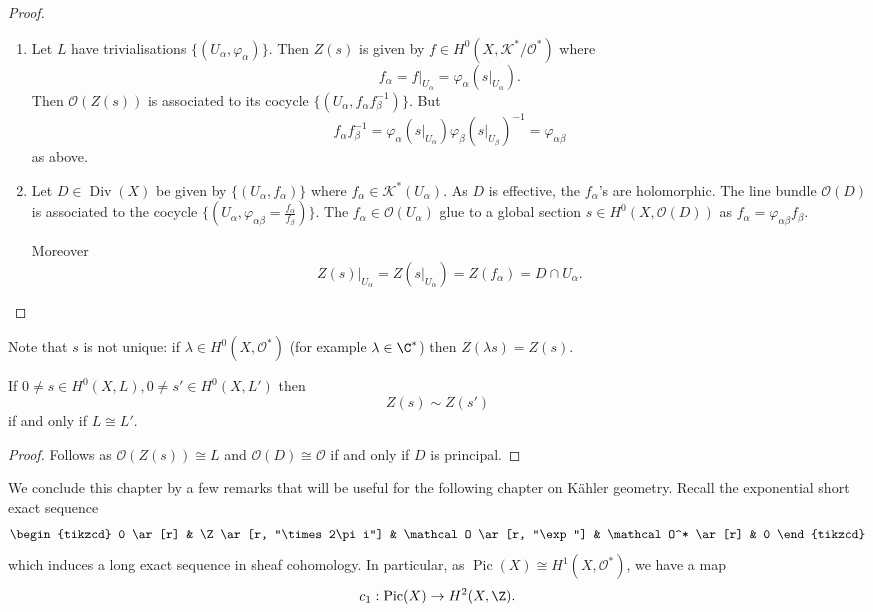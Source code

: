 \documentclass[a4paper]{article}
\DeclareMathOperator{\Pic}{Pic} %
\DeclareMathOperator{\Div}{Div} %
\begin{document}
\begin{proof}\leavevmode
  \begin{enumerate}
  \item Let \(L\) have trivialisations \(\{(U_\alpha, \varphi_\alpha)\}\). Then \(Z(s)\) is given by \(f \in H^0(X, \mathcal K^*/\mathcal O^*)\) where
    \[
      f_\alpha = f|_{U_\alpha} = \varphi_\alpha(s|_{U_\alpha}).
    \]
    Then \(\mathcal O(Z(s))\) is associated to its cocycle \(\{(U_\alpha, f_\alpha f_\beta^{-1})\}\). But
    \[
      f_\alpha f_\beta^{-1}
      = \varphi_\alpha(s|_{U_\alpha}) \varphi_\beta(s|_{U_\beta})^{-1}
      = \varphi_{\alpha\beta}
    \]
    as above.
  \item Let \(D \in \Div(X)\) be given by \(\{(U_\alpha, f_\alpha)\}\) where \(f_\alpha \in \mathcal K^*(U_\alpha)\). As \(D\) is effective, the \(f_\alpha\)'s are holomorphic. The line bundle \(\mathcal O(D)\) is associated to the cocycle \(\{(U_\alpha, \varphi_{\alpha\beta} = \frac{f_\alpha}{f_\beta})\}\). The \(f_\alpha \in \mathcal O(U_\alpha)\) glue to a global section \(s \in H^0(X, \mathcal O(D))\) as \(f_\alpha = \varphi_{\alpha\beta} f_\beta\).

    Moreover
    \[
      Z(s)|_{U_\alpha} = Z(s|_{U_\alpha}) = Z(f_\alpha) = D \cap U_\alpha.
    \]
  \end{enumerate}
\end{proof}

Note that \(s\) is not unique: if \(\lambda \in H^0(X, \mathcal O^*)\) (for example \(\lambda \in \C^*\)) then \(Z(\lambda s) = Z(s)\).

\begin{corollary}
  If \(0 \neq s \in H^0(X, L), 0 \neq s' \in H^0(X, L')\) then
  \[
    Z(s) \sim Z(s')
  \]
  if and only if \(L \cong L'\).
\end{corollary}

\begin{proof}
  Follows as \(\mathcal O(Z(s)) \cong L\) and \(\mathcal O(D) \cong \mathcal O\) if and only if \(D\) is principal.
\end{proof}

We conclude this chapter by a few remarks that will be useful for the following chapter on Kähler geometry. Recall the exponential short exact sequence
\[
  \begin{tikzcd}
    0 \ar[r] & \Z \ar[r, "\times 2\pi i"] & \mathcal O \ar[r, "\exp"] & \mathcal O^* \ar[r] & 0
  \end{tikzcd}
\]
which induces a long exact sequence in sheaf cohomology. In particular, as \(\Pic(X) \cong H^1(X, \mathcal O^*)\), we have a map
\[
  c_1: \Pic(X) \to H^2(X, \Z).
\]
\end{document}
